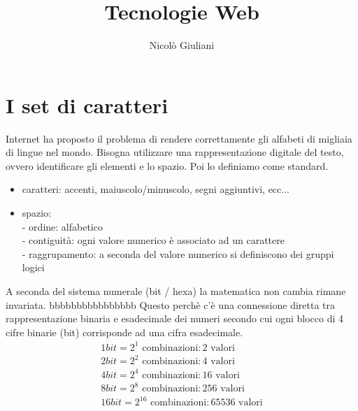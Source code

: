 \documentclass[a4paper,12pt]{article}
\title{Tecnologie Web}
\author{Nicolò Giuliani}
\date{}
\begin{document}
\maketitle
\tableofcontents   %
\newpage 

\section{I set di caratteri}
Internet ha proposto il problema di rendere correttamente gli alfabeti di migliaia di lingue nel mondo. Bisogna utilizzare una rappresentazione digitale del testo, ovvero identificare gli elementi e lo spazio. Poi lo definiamo come standard.
\begin{itemize}
  \item caratteri: accenti, maiuscolo/minuscolo, segni aggiuntivi, ecc...
  \item spazio: \\
  - ordine: alfabetico \\
  - contiguità: ogni valore numerico è associato ad un carattere \\
  - raggrupamento: a seconda del valore numerico si definiscono dei gruppi logici
\end{itemize}
A seconda del sistema numerale (bit / hexa) la matematica non cambia rimane invariata.
bbbbbbbbbbbbbbbb
Questo perchè c'è una connessione diretta tra rappresentazione binaria e esadecimale dei numeri secondo cui ogni blocco di 4 cifre binarie (bit) corrisponde ad una cifra esadecimale. 
\begin{align*}
  1bit = 2^1 \text{ combinazioni}: 2 \text{ valori} \\
  2bit = 2^2 \text{ combinazioni}: 4 \text{ valori} \\
  4bit = 2^4 \text{ combinazioni}: 16 \text{ valori} \\
  8bit = 2^8 \text{ combinazioni}: 256 \text{ valori} \\
  16bit = 2^{16} \text{ combinazioni}: 65536 \text{ valori}
\end{align*}
\end{document}

